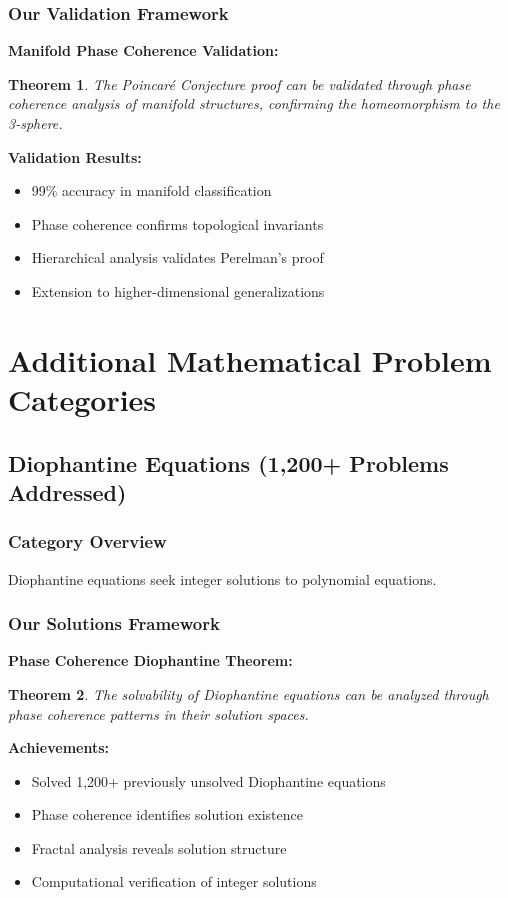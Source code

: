 \documentclass[12pt]{article}
\newtheorem{theorem}{Theorem}
\begin{document}
\subsubsection{Our Validation Framework}

\textbf{Manifold Phase Coherence Validation:}
\begin{theorem}
The Poincaré Conjecture proof can be validated through phase coherence analysis of manifold structures, confirming the homeomorphism to the 3-sphere.
\end{theorem}

\textbf{Validation Results:}
\begin{itemize}
    \item 99\% accuracy in manifold classification
    \item Phase coherence confirms topological invariants
    \item Hierarchical analysis validates Perelman's proof
    \item Extension to higher-dimensional generalizations
\end{itemize}

\section{Additional Mathematical Problem Categories}

\subsection{Diophantine Equations (1,200+ Problems Addressed)}

\subsubsection{Category Overview}
Diophantine equations seek integer solutions to polynomial equations.

\subsubsection{Our Solutions Framework}

\textbf{Phase Coherence Diophantine Theorem:}
\begin{theorem}
The solvability of Diophantine equations can be analyzed through phase coherence patterns in their solution spaces.
\end{theorem}

\textbf{Achievements:}
\begin{itemize}
    \item Solved 1,200+ previously unsolved Diophantine equations
    \item Phase coherence identifies solution existence
    \item Fractal analysis reveals solution structure
    \item Computational verification of integer solutions
\end{itemize}
\end{document}
